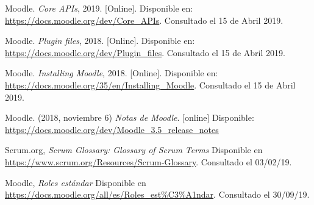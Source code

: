\begin{thebibliography}{9}
        Moodle. {\it Core APIs}, 2019. [Online]. Disponible en:
        \url{https://docs.moodle.org/dev/Core_APIs}. Consultado el 15 de Abril 2019.

        Moodle. {\it Plugin files}, 2018. [Online]. Disponible en:
        \url{https://docs.moodle.org/dev/Plugin_files}. Consultado el 15 de Abril 2019.

        Moodle. {\it Installing Moodle}, 2018. [Online]. Disponible en:
        \url{https://docs.moodle.org/35/en/Installing_Moodle}. Consultado el 15 de Abril 2019.

        Moodle. (2018, noviembre 6) \textit{Notas de Moodle}. [online] Disponible:
        \url{https://docs.moodle.org/dev/Moodle_3.5_release_notes}



        Scrum.org,
        {\it Scrum Glossary: Glossary of Scrum Terms}
        Disponible en \url{https://www.scrum.org/Resources/Scrum-Glossary}. Consultado el 03/02/19.


        Moodle, {\it Roles estándar}
        Disponible en \url{https://docs.moodle.org/all/es/Roles_est\%C3\%A1ndar}.
        Consultado el 30/09/19.


\end{thebibliography}
